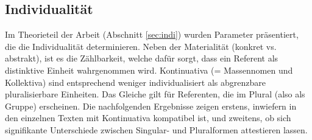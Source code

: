 



\subsection{Individualität}\label{sec:ergeb-individualität}

Im Theorieteil der Arbeit (Abschnitt \ref{sec:indi}) wurden Parameter präsentiert, die die  Individualität determinieren. Neben der Materialität (konkret vs. abstrakt), ist es die Zählbarkeit, welche dafür sorgt, dass ein Referent als distinktive Einheit wahrgenommen wird. Kontinuativa (= Massennomen und Kollektiva) sind entsprechend weniger individualisiert als abgrenzbare pluralisierbare Einheiten. Das Gleiche gilt für Referenten, die im Plural (also als Gruppe) erscheinen. Die nachfolgenden Ergebnisse zeigen erstens, inwiefern  in den einzelnen Texten mit Kontinuativa kompatibel ist, und zweitens, ob sich signifikante Unterschiede zwischen Singular- und Pluralformen attestieren lassen.


